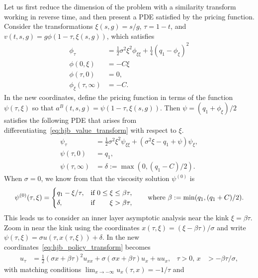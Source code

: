 \documentclass[main.tex]{subfiles}
\begin{document}
Let us first reduce the dimension of the problem with a similarity
transform working in reverse time, and then present a PDE satisfied by the pricing function.
Consider the transformations $\xi(s,g) = s/g$, $\tau=1-t$, and
$v(t,s,g)=g\phi(1-\tau,\xi(s,g))$, which satisfies
\begin{align}\label{eq:hjb_value_transform}
  \phi_\tau &= \frac{1}{2}\sigma^2\xi^2\phi_{\xi\xi} +
              \frac{1}{4}{(q_1 - \phi_\xi)}^2 \\
  \phi(0,\xi) &= -C\xi\\
  \phi(\tau,0)& = 0,\\
  \phi_\xi(\tau,\infty) &= -C.
\end{align}
In the new coordinates, define the pricing function in terms of the
function $\psi(\tau,\xi)$ so that $a^B(t,s,g)=\psi(1-\tau,\xi(s,g))$.
Then $\psi = (q_1+\phi_\xi)/2$ satisfies the following PDE
that arises from differentiating~\eqref{eq:hjb_value_transform} with
respect to $\xi$.
\begin{align}\label{eq:hjb_policy_transform}
  \psi_\tau&= \frac{1}{2}\sigma^2 \xi^2
             \psi_{\xi\xi} +
             (\sigma^2\xi - q_1 + \psi)\psi_\xi,\\
  \psi(\tau,0) &= q_1,\\
  \psi(\tau,\infty) &= \delta:=\max(0,(q_1-C)/2).
\end{align}
When $\sigma=0$, we know from  that
the viscosity solution $\psi^{(0)}$ is
\begin{equation}
  \psi^{(0)}(\tau,\xi)=\begin{cases}
    q_1-\xi/\tau, &\text{if } 0\leq \xi\leq
    \beta \tau,\\
    \delta,&\text{if } \hfill \xi > \beta \tau,
  \end{cases}
  \qquad \textnormal{where } \beta:=\min(q_1,(q_1+C)/2).
\end{equation}
This leads us to consider an inner layer asymptotic analysis near
the kink $\xi = \beta \tau$. Zoom in near the kink using the coordinates
$x(\tau,\xi) = (\xi-\beta \tau)/\sigma$ and write $\psi(\tau,\xi) = \sigma
u(\tau,x(\tau,\xi)) + \delta$. In the new
coordinates~\eqref{eq:hjb_policy_transform} becomes
\begin{align}
  u_\tau %
  &=\frac{1}{2}{(\sigma x + \beta \tau)}^2u_{xx}
    +\sigma (\sigma x+\beta \tau)u_x  %
    + uu_x,&\tau>0,\,x&> -\beta \tau/\sigma,
\end{align}
with matching conditions $\lim_{x \to -\infty} u_x(\tau,x) = -1/\tau$ and
\end{document}
